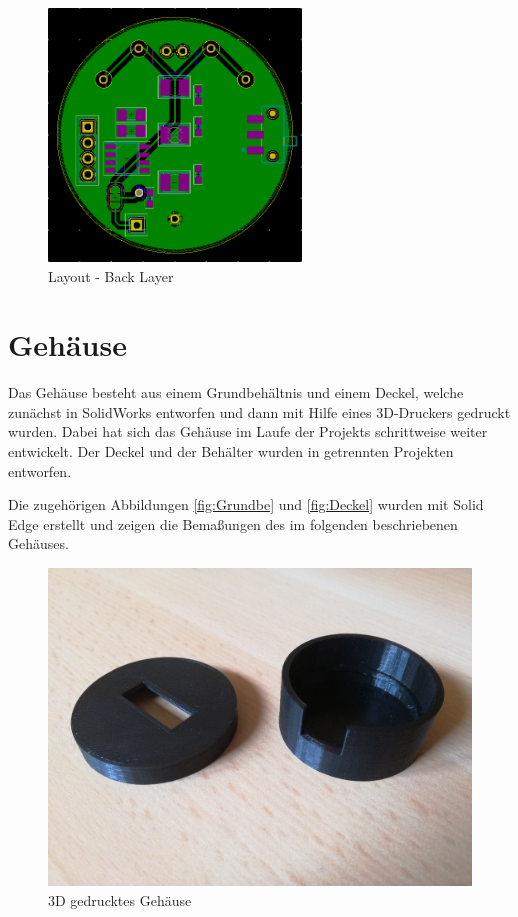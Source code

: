 \documentclass[a4paper,
DIV=13,
12pt,
BCOR=10mm,
department=FakEI,
parskip=half,
automark,
]{article}
\begin{document}
\begin{figure}[!hbpt]
 \begin{center} \includegraphics[width=0.6\textwidth]{Layout_Back.png}
 \caption{Layout - Back Layer}
 \label{fig:Back}
  \end{center}
\end{figure}

\newpage

\section{Gehäuse}
Das Gehäuse besteht aus einem Grundbehältnis und einem Deckel, welche zunächst in SolidWorks entworfen und dann mit Hilfe eines 3D-Druckers gedruckt wurden. Dabei hat sich das Gehäuse im Laufe der Projekts schrittweise weiter entwickelt. Der Deckel und der Behälter wurden in getrennten Projekten entworfen. 

Die zugehörigen Abbildungen \ref{fig:Grundbe} und \ref{fig:Deckel} wurden mit Solid Edge erstellt und zeigen die Bemaßungen des im folgenden beschriebenen Gehäuses.

\begin{figure}[!hbpt]
 \begin{center} \includegraphics[width=1\textwidth]{Gehauuse_Stimmungslicht.jpg}
 \caption{3D gedrucktes Gehäuse}
 \label{fig:Register}
  \end{center}
\end{figure}
\end{document}
